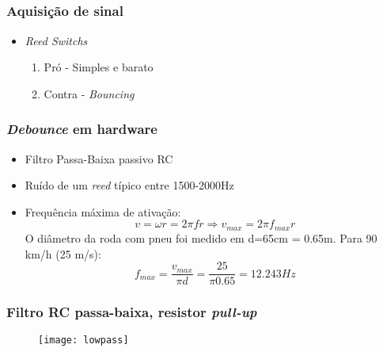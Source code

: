 \documentclass{beamer}
\begin{document}
\subsection{}
\begin{frame}
  \frametitle{Aquisição de sinal}
  \begin{itemize}
    \item \textit{Reed Switchs}
    \begin{enumerate}
      \item Pró - Simples e barato
      \item Contra - \textit{Bouncing}
    \end{enumerate}
  \end{itemize}

\begin{figure}[h!]
 \centering
   \hfil
  \label{fig:reed}
\end{figure}
\end{frame}

\begin{frame}
 \frametitle{\textit{Debounce} em hardware}
  \begin{itemize}
    \item Filtro Passa-Baixa passivo RC
    \item Ruído de um \textit{reed} típico entre 1500-2000Hz
    \item Frequência máxima de ativação:
    \begin{equation}
  v = \omega r = 2\pi f r \Rightarrow v_{max} = 2\pi f_{max} r
\end{equation}
O diâmetro da roda com pneu foi medido em d=65cm = 0.65m. Para 90
km/h (25 m/s):
\begin{equation}
  f_{max} = \frac{\displaystyle v_{max}}{\displaystyle \pi d} =
\frac{\displaystyle 25}{\displaystyle \pi 0.65} = 12.243 Hz
\end{equation}

  \end{itemize}
\end{frame}

\begin{frame}
  \frametitle{Filtro RC passa-baixa, resistor \textit{pull-up}}
  \begin{center}
    \begin{figure}
      \texttt{[image: lowpass]}
    \end{figure}
  \end{center}
\end{frame}
\end{document}
